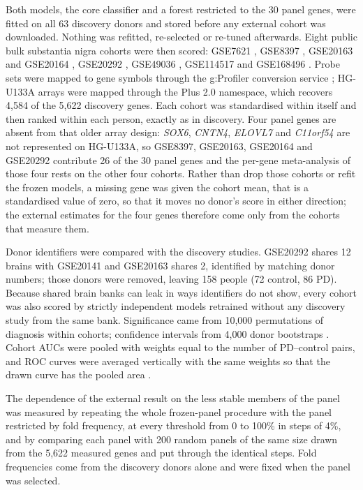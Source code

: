 \documentclass[11pt,a4paper]{article}
\begin{document}
Both models, the core classifier and a forest restricted to the 30 panel genes, were fitted on all 63
discovery donors and stored before any external cohort was downloaded. Nothing was refitted, re-selected or
re-tuned afterwards. Eight public bulk substantia nigra cohorts were then scored: GSE7621
\citep{lesnick2007}, GSE8397 \citep{moran2006}, GSE20163 and GSE20164 \citep{zheng2010}, GSE20292
\citep{zhang2005}, GSE49036 \citep{dijkstra2015}, GSE114517 \citep{simchovitz2020} and GSE168496
\citep{tranchevent2023}. Probe sets were mapped to gene symbols through the g:Profiler conversion service
\citep{kolberg2023}; HG-U133A arrays were mapped through the Plus 2.0 namespace, which recovers 4,584 of the
5,622 discovery genes. Each cohort was standardised within itself and then ranked within each person, exactly
as in discovery. Four panel genes are absent from that older array design: \textit{SOX6}, \textit{CNTN4},
\textit{ELOVL7} and \textit{C11orf54} are not represented on HG-U133A, so GSE8397, GSE20163, GSE20164 and
GSE20292 contribute 26 of the 30 panel genes and the per-gene meta-analysis of those four rests on the other
four cohorts. Rather than drop those cohorts or refit the frozen models, a missing gene was given the cohort
mean, that is a standardised value of zero, so that it moves no donor's score in either direction; the
external estimates for the four genes therefore come only from the cohorts that measure them.

Donor identifiers were compared with the discovery studies. GSE20292 shares 12 brains with GSE20141 and
GSE20163 shares 2, identified by matching donor numbers; those donors were removed, leaving 158 people (72
control, 86 PD). Because shared brain banks can leak in ways identifiers do not show, every cohort was also
scored by strictly independent models retrained without any discovery study from the same bank. Significance
came from 10,000 permutations of diagnosis within cohorts; confidence intervals from 4,000 donor bootstraps
\citep{efron1979}. Cohort AUCs were pooled with weights equal to the number of PD--control pairs, and ROC
curves were averaged vertically with the same weights so that the drawn curve has the pooled area
\citep{hanley1982}.

The dependence of the external result on the less stable members of the panel was measured by repeating the
whole frozen-panel procedure with the panel restricted by fold frequency, at every threshold from 0 to 100\%
in steps of 4\%, and by comparing each panel with 200 random panels of the same size drawn from the 5,622
measured genes and put through the identical steps. Fold frequencies come from the discovery donors alone and
were fixed when the panel was selected.
\end{document}
